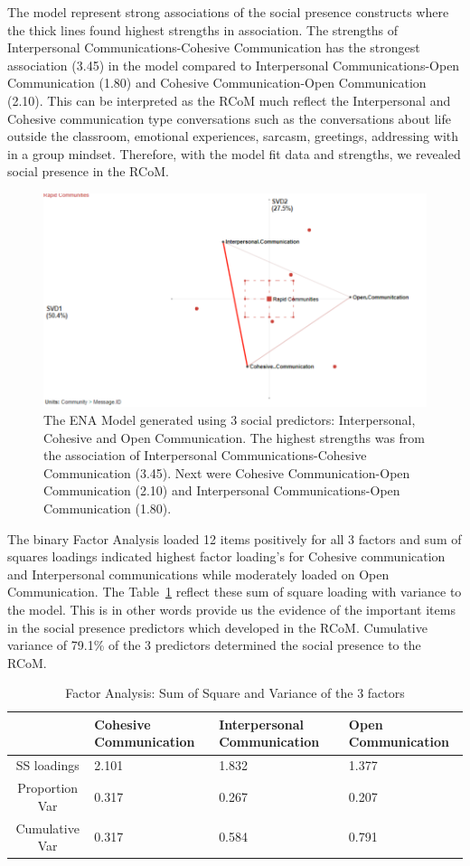 \documentclass[format=acmsmall, review=false, screen=true]{acmart}
\begin{document}
The model represent strong associations of the social presence constructs where the thick lines found highest strengths in association. The strengths of Interpersonal Communications-Cohesive Communication has the strongest association (3.45) in the model compared to Interpersonal Communications-Open Communication (1.80) and Cohesive Communication-Open Communication (2.10). This can be interpreted as the RCoM much reflect the Interpersonal and Cohesive communication type conversations such as the conversations about life outside the classroom, emotional experiences, sarcasm, greetings, addressing with in a group mindset. Therefore, with the model fit data and strengths, we revealed social presence in the RCoM. 
\begin{figure}[h]
 \centering
 \includegraphics[width=0.7\linewidth]{images/ENASocialP.png}
 \caption{The ENA Model generated using 3 social predictors: Interpersonal, Cohesive and Open Communication. The highest strengths was from the association of Interpersonal Communications-Cohesive Communication (3.45). Next were Cohesive Communication-Open Communication (2.10) and Interpersonal Communications-Open Communication (1.80). }
 \label{fig:primary}
\end{figure}

The binary Factor Analysis loaded 12 items positively for all 3 factors and sum of squares loadings indicated highest factor loading's for Cohesive communication and Interpersonal communications while moderately loaded on Open Communication. The Table~\ref{tab:FA} reflect these sum of square loading with variance to the model. This is in other words provide us the evidence of the important items in the social presence predictors which developed in the RCoM. Cumulative variance of 79.1\% of the 3 predictors determined the social presence to the RCoM. 

\begin{table}[h!]
\caption{Factor Analysis: Sum of Square and Variance of the 3 factors }
\label{tab:FA}
\centering
 \begin{tabular}{c|p{2cm}|p{2cm}|p{2cm}}
 \toprule
 & Cohesive Communication & Interpersonal Communication & Open Communication \\
 \midrule
 SS loadings & 2.101 & 1.832 & 1.377 \\
 Proportion Var & 0.317 & 0.267 & 0.207 \\
 Cumulative Var & 0.317 & 0.584 & 0.791 \\
 \bottomrule
 \end{tabular}
 \end{table}
\end{document}
